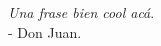 \cleardoublepage
\vspace*{3cm}
\begin{flushright}
	\textit{Una frase bien cool acá}. \\
	- Don Juan.
\end{flushright}
\cleardoublepage